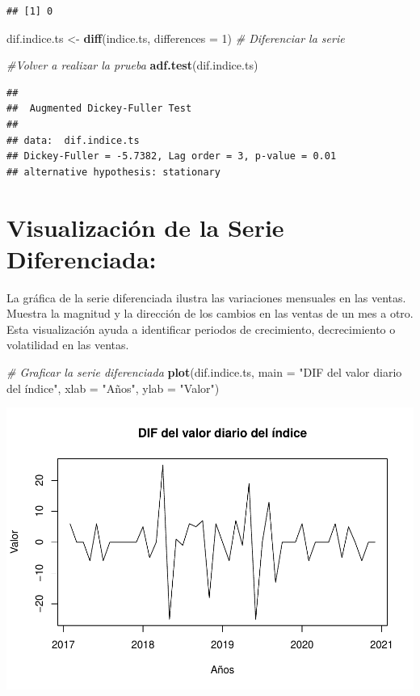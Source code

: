 \documentclass[
]{book}
\newenvironment{Shaded}{\begin{snugshade}}{\end{snugshade}}
\newcommand{\AttributeTok}[1]{\textcolor[rgb]{0.13,0.29,0.53}{#1}}
\newcommand{\CommentTok}[1]{\textcolor[rgb]{0.56,0.35,0.01}{\textit{#1}}}
\newcommand{\DecValTok}[1]{\textcolor[rgb]{0.00,0.00,0.81}{#1}}
\newcommand{\FunctionTok}[1]{\textcolor[rgb]{0.13,0.29,0.53}{\textbf{#1}}}
\newcommand{\NormalTok}[1]{#1}
\newcommand{\OtherTok}[1]{\textcolor[rgb]{0.56,0.35,0.01}{#1}}
\newcommand{\StringTok}[1]{\textcolor[rgb]{0.31,0.60,0.02}{#1}}
\begin{document}
\begin{verbatim}
## [1] 0
\end{verbatim}

\begin{Shaded}
\begin{Highlighting}[]
\NormalTok{dif.indice.ts }\OtherTok{\textless{}{-}} \FunctionTok{diff}\NormalTok{(indice.ts, }\AttributeTok{differences =} \DecValTok{1}\NormalTok{) }\CommentTok{\# Diferenciar la serie}


\CommentTok{\#Volver a realizar la prueba}
\FunctionTok{adf.test}\NormalTok{(dif.indice.ts)}
\end{Highlighting}
\end{Shaded}

\begin{verbatim}
## 
##  Augmented Dickey-Fuller Test
## 
## data:  dif.indice.ts
## Dickey-Fuller = -5.7382, Lag order = 3, p-value = 0.01
## alternative hypothesis: stationary
\end{verbatim}

\section{Visualización de la Serie Diferenciada:}\label{visualizaciuxf3n-de-la-serie-diferenciada}

La gráfica de la serie diferenciada ilustra las variaciones mensuales en las ventas. Muestra la magnitud y la dirección de los cambios en las ventas de un mes a otro. Esta visualización ayuda a identificar periodos de crecimiento, decrecimiento o volatilidad en las ventas.

\begin{Shaded}
\begin{Highlighting}[]
\CommentTok{\# Graficar la serie diferenciada}
\FunctionTok{plot}\NormalTok{(dif.indice.ts,  }\AttributeTok{main =} \StringTok{"DIF del valor diario del índice"}\NormalTok{, }\AttributeTok{xlab =} \StringTok{"Años"}\NormalTok{, }\AttributeTok{ylab =} \StringTok{"Valor"}\NormalTok{)}
\end{Highlighting}
\end{Shaded}

\includegraphics{_main_files/figure-latex/unnamed-chunk-15-1.pdf}
\end{document}
